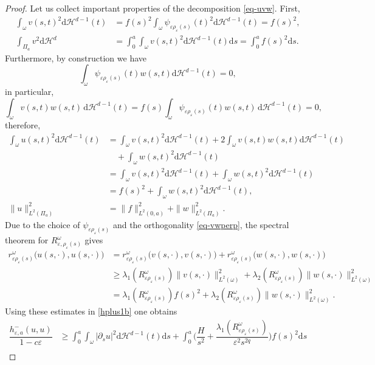 \documentclass[11pt,oneside,reqno,a4paper]{amsart}
\newcommand{\dd}{\mathrm{d}}
\renewcommand{\H}{\mathcal{H}}
\newcommand{\eps}{\varepsilon}
\theoremstyle{definition}
\begin{document}
\begin{proof}
Let us collect important properties of the decomposition \eqref{eq-uvw}.
First,
\begin{align*}
	\int_\omega v(s,t)^2\dd \H^{d-1}(t)&=f(s)^2\int_\omega \psi_{\eps\rho_\eps(s)}(t)^2\dd \H^{d-1}(t)=f(s)^2,\\
	\int_{\Pi_a}v^2\dd\H^d&=\int_0^a 	\int_\omega v(s,t)^2\dd \H^{d-1}(t)\dd s=\int_0^a f(s)^2\dd s.
\end{align*}
Furthermore, by construction we have
\begin{equation}
	\label{vw00}
\int_\omega \psi_{\eps\rho_\eps(s)}(t)w(s,t)\dd \H^{d-1}(t)=0,
\end{equation}
in particular,
\begin{equation}
	\label{eq-vwperp}
\int_\omega v(s,t)w(s,t)\,\dd \H^{d-1}(t)=f(s)\int_\omega \psi_{\eps\rho_\eps(s)}(t)w(s,t)\,\dd \H^{d-1}(t)
=0,
\end{equation}
therefore,
\begin{align*}
	\int_\omega u(s,t)^2\dd\H^{d-1}(t)&=\int_\omega v(s,t)^2\dd \H^{d-1}(t) +2 \int_\omega v(s,t)w(s,t)\dd \H^{d-1}(t)\\
	&\quad+\int_\omega w(s,t)^2\dd \H^{d-1}(t)\\
	&=\int_\omega v(s,t)^2\dd \H^{d-1}(t) +\int_\omega w(s,t)^2\dd \H^{d-1}(t)\\
	&=f(s)^2+\int_\omega w(s,t)^2\dd \H^{d-1}(t),\\
	\|u\|^2_{L^2(\Pi_a)}&=\|f\|^2_{L^2(0,a)}+\|w\|^2_{L^2(\Pi_a)}.
\end{align*}
Due to the choice of $\psi_{\eps\rho_\eps(s)}$ and the orthogonality  \eqref{eq-vwperp}, the spectral theorem for $R^\omega_{\eps,\rho_\eps(s)}$ gives
\begin{align*}
r^\omega_{\eps\rho_\eps(s)}\big(u(s,\cdot),u(s,\cdot)\big)&=
r^\omega_{\eps\rho_\eps(s)}\big(v(s,\cdot),v(s,\cdot)\big)+r^\omega_{\eps\rho_\eps(s)}\big(w(s,\cdot),w(s,\cdot)\big)\\
&\ge
\lambda_1(R^\omega_{\eps\rho_\eps(s)}) \big\| v(s,\cdot)\big\|^2_{L^2(\omega)}
+\lambda_2(R^\omega_{\eps\rho_\eps(s)}) \big\| w(s,\cdot)\big\|^2_{L^2(\omega)}\\
&=\lambda_1(R^\omega_{\eps\rho_\eps(s)}) f(s)^2
+\lambda_2(R^\omega_{\eps\rho_\eps(s)}) \big\| w(s,\cdot)\big\|^2_{L^2(\omega)}.
\end{align*}
Using these estimates in \eqref{hplus1b} one obtains
\begin{align*}
	\dfrac{h^-_{\eps,a}(u,u)}{1-c\eps}&\ge \int_0^a\int_\omega |\partial_s u|^2\dd\H^{d-1}(t)\dd s+\int_0^a\bigg(\dfrac{H}{s^2}+\dfrac{\lambda_1(R^\omega_{\eps\rho_\eps(s)})}{\eps^2 s^{2q}}\bigg)f(s)^2\dd s\\

\end{align*}
\end{proof}
\end{document}
